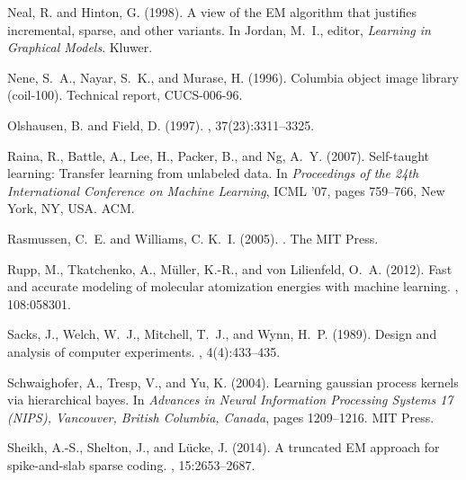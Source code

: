 \documentclass[12pt]{article}
\begin{document}
\begin{thebibliography}{}
Neal, R. and Hinton, G. (1998).
\newblock A view of the {EM} algorithm that justifies incremental, sparse, and
  other variants.
\newblock In Jordan, M.~I., editor, {\em Learning in Graphical Models}. Kluwer.

Nene, S.~A., Nayar, S.~K., and Murase, H. (1996).
\newblock Columbia object image library (coil-100).
\newblock Technical report, CUCS-006-96.

Olshausen, B. and Field, D. (1997).
, 37(23):3311--3325.

Raina, R., Battle, A., Lee, H., Packer, B., and Ng, A.~Y. (2007).
\newblock Self-taught learning: Transfer learning from unlabeled data.
\newblock In {\em Proceedings of the 24th International Conference on Machine
  Learning}, ICML '07, pages 759--766, New York, NY, USA. ACM.

Rasmussen, C.~E. and Williams, C. K.~I. (2005).
.
\newblock The MIT Press.

Rupp, M., Tkatchenko, A., M\"uller, K.-R., and von Lilienfeld, O.~A. (2012).
\newblock Fast and accurate modeling of molecular atomization energies with
  machine learning.
, 108:058301.

Sacks, J., Welch, W.~J., Mitchell, T.~J., and Wynn, H.~P. (1989).
\newblock Design and analysis of computer experiments.
, 4(4):433--435.

Schwaighofer, A., Tresp, V., and Yu, K. (2004).
\newblock Learning gaussian process kernels via hierarchical bayes.
\newblock In {\em Advances in Neural Information Processing Systems 17
  ({NIPS}), Vancouver, British Columbia, Canada}, pages 1209--1216. MIT Press.

Sheikh, A.-S., Shelton, J., and L\"ucke, J. (2014).
\newblock A truncated {EM} approach for spike-and-slab sparse coding.
, 15:2653--2687.


\end{thebibliography}
\end{document}
